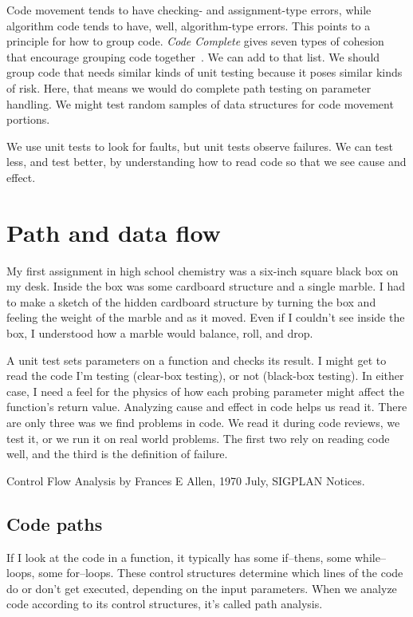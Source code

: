 \documentclass[fleqn,10pt]{olplainarticle}
\begin{document}
Code movement tends to have checking- and assignment-type errors,
while algorithm code tends to have, well, algorithm-type errors.
This points to a principle for how to group code.
\emph{Code Complete} gives seven types of cohesion that encourage
grouping code together~\citep{mcconnell2004code}. We can add to that list. We should group
code that needs similar kinds of unit testing because it poses
similar kinds of risk. Here, that means we would do complete
path testing on parameter handling. We might test random samples
of data structures for code movement portions.

We use unit tests to look for faults, but unit tests observe
failures. We can test less, and test better, by understanding
how to read code so that we see cause and effect.


\section{Path and data flow}

My first assignment in high school chemistry was a six-inch square
black box on my desk. Inside the box was some cardboard structure
and a single marble. I had to make a sketch of the hidden cardboard
structure by turning the box and feeling the weight of the marble
and as it moved. Even if I couldn't see inside the box, I
understood how a marble would balance, roll, and drop.

A unit test sets parameters on a function and checks its result.
I might get to read the code I'm testing (clear-box testing),
or not (black-box testing). In either case, I need a feel for
the physics of how each probing parameter might affect the
function's return value. Analyzing cause and effect in code
helps us read it. There are only three was we find problems
in code. We read it during code reviews, we test it, or we run it on
real world problems. The first two rely on reading code well,
and the third is the definition of failure.

Control Flow Analysis by Frances E Allen, 1970 July, SIGPLAN Notices.

\subsection{Code paths}\label{sec:code-paths}

If I look at the code in a function, it typically has
some if--thens, some while--loops, some for--loops. These
control structures determine which lines of the code do
or don't get executed, depending on the input parameters.
When we analyze code according to its control structures,
it's called path analysis.
\end{document}
